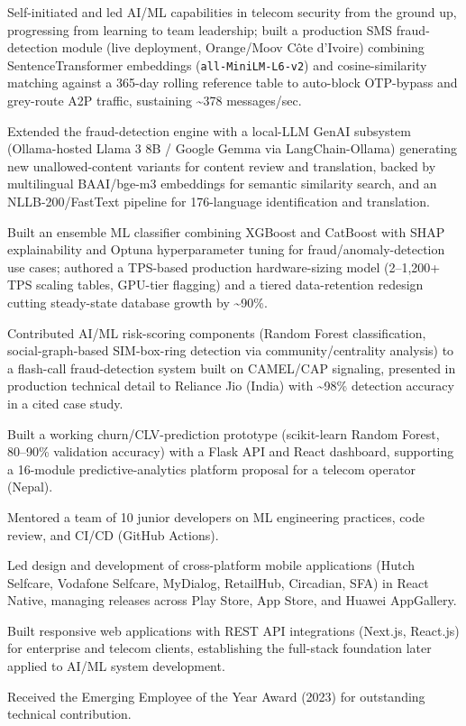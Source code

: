 \documentclass[10.5pt]{article}
\begin{document}
\begin{cvitems}
  \item Self-initiated and led AI/ML capabilities in telecom security from the ground up, progressing from learning to team leadership; built a production SMS fraud-detection module (live deployment, Orange/Moov C\^ote d'Ivoire) combining SentenceTransformer embeddings (\texttt{all-MiniLM-L6-v2}) and cosine-similarity matching against a 365-day rolling reference table to auto-block OTP-bypass and grey-route A2P traffic, sustaining \textasciitilde378 messages/sec.
  \item Extended the fraud-detection engine with a local-LLM GenAI subsystem (Ollama-hosted Llama 3 8B / Google Gemma via LangChain-Ollama) generating new unallowed-content variants for content review and translation, backed by multilingual BAAI/bge-m3 embeddings for semantic similarity search, and an NLLB-200/FastText pipeline for 176-language identification and translation.
  \item Built an ensemble ML classifier combining XGBoost and CatBoost with SHAP explainability and Optuna hyperparameter tuning for fraud/anomaly-detection use cases; authored a TPS-based production hardware-sizing model (2--1,200+ TPS scaling tables, GPU-tier flagging) and a tiered data-retention redesign cutting steady-state database growth by \textasciitilde90\%.
  \item Contributed AI/ML risk-scoring components (Random Forest classification, social-graph-based SIM-box-ring detection via community/centrality analysis) to a flash-call fraud-detection system built on CAMEL/CAP signaling, presented in production technical detail to Reliance Jio (India) with \textasciitilde98\% detection accuracy in a cited case study.
  \item Built a working churn/CLV-prediction prototype (scikit-learn Random Forest, 80--90\% validation accuracy) with a Flask API and React dashboard, supporting a 16-module predictive-analytics platform proposal for a telecom operator (Nepal).
  \item Mentored a team of 10 junior developers on ML engineering practices, code review, and CI/CD (GitHub Actions).
\end{cvitems}

\begin{cvitems}
  \item Led design and development of cross-platform mobile applications (Hutch Selfcare, Vodafone Selfcare, MyDialog, RetailHub, Circadian, SFA) in React Native, managing releases across Play Store, App Store, and Huawei AppGallery.
  \item Built responsive web applications with REST API integrations (Next.js, React.js) for enterprise and telecom clients, establishing the full-stack foundation later applied to AI/ML system development.
  \item Received the Emerging Employee of the Year Award (2023) for outstanding technical contribution.
\end{cvitems}
\end{document}

